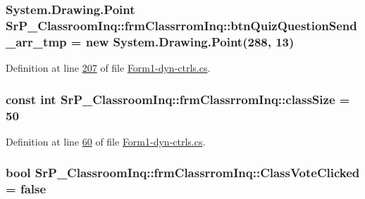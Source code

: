 \hypertarget{class_sr_p___classroom_inq_1_1frm_classrrom_inq_a8dcbe5ae5d44d445994571c17345e756}{
\subsubsection[{btn\-Quiz\-Question\-Send\-\_\-arr\-\_\-tmp}]{\setlength{\rightskip}{0pt plus 5cm}\-System.\-Drawing.\-Point {\bf \-Sr\-P\-\_\-\-Classroom\-Inq\-::frm\-Classrrom\-Inq\-::btn\-Quiz\-Question\-Send\-\_\-arr\-\_\-tmp} = new \-System.\-Drawing.\-Point(288, 13)}}
\label{class_sr_p___classroom_inq_1_1frm_classrrom_inq_a8dcbe5ae5d44d445994571c17345e756}


\-Definition at line \hyperlink{_form1-dyn-ctrls_8cs_source_l00207}{207} of file \hyperlink{_form1-dyn-ctrls_8cs_source}{\-Form1-\/dyn-\/ctrls.\-cs}.

\hypertarget{class_sr_p___classroom_inq_1_1frm_classrrom_inq_a78d9aab335edfe53d39036b9d89928a8}{
\subsubsection[{class\-Size}]{\setlength{\rightskip}{0pt plus 5cm}const int {\bf \-Sr\-P\-\_\-\-Classroom\-Inq\-::frm\-Classrrom\-Inq\-::class\-Size} = 50}}
\label{class_sr_p___classroom_inq_1_1frm_classrrom_inq_a78d9aab335edfe53d39036b9d89928a8}


\-Definition at line \hyperlink{_form1-dyn-ctrls_8cs_source_l00060}{60} of file \hyperlink{_form1-dyn-ctrls_8cs_source}{\-Form1-\/dyn-\/ctrls.\-cs}.

\hypertarget{class_sr_p___classroom_inq_1_1frm_classrrom_inq_a1e2c8341b4d2988c61648bea9a4c412b}{
\subsubsection[{\-Class\-Vote\-Clicked}]{\setlength{\rightskip}{0pt plus 5cm}bool {\bf \-Sr\-P\-\_\-\-Classroom\-Inq\-::frm\-Classrrom\-Inq\-::\-Class\-Vote\-Clicked} = false}}
\label{class_sr_p___classroom_inq_1_1frm_classrrom_inq_a1e2c8341b4d2988c61648bea9a4c412b}



